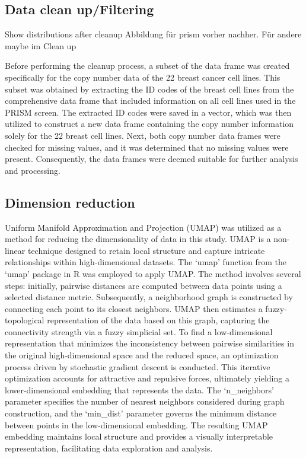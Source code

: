 \documentclass[
  11pt,
]{article}
\begin{document}
\hypertarget{data-clean-upfiltering}{%
\subsection{Data clean up/Filtering}\label{data-clean-upfiltering}}

Show distributions after cleanup Abbildung für prism vorher nachher. Für
andere maybe im Clean up

Before performing the cleanup process, a subset of the data frame was
created specifically for the copy number data of the 22 breast cancer
cell lines. This subset was obtained by extracting the ID codes of the
breast cell lines from the comprehensive data frame that included
information on all cell lines used in the PRISM screen. The extracted ID
codes were saved in a vector, which was then utilized to construct a new
data frame containing the copy number information solely for the 22
breast cell lines. Next, both copy number data frames were checked for
missing values, and it was determined that no missing values were
present. Consequently, the data frames were deemed suitable for further
analysis and processing.

\hypertarget{dimension-reduction}{%
\subsection{Dimension reduction}\label{dimension-reduction}}

Uniform Manifold Approximation and Projection (UMAP) was utilized as a
method for reducing the dimensionality of data in this study. UMAP is a
non-linear technique designed to retain local structure and capture
intricate relationships within high-dimensional datasets. The `umap'
function from the `umap' package in R was employed to apply UMAP. The
method involves several steps: initially, pairwise distances are
computed between data points using a selected distance metric.
Subsequently, a neighborhood graph is constructed by connecting each
point to its closest neighbors. UMAP then estimates a fuzzy-topological
representation of the data based on this graph, capturing the
connectivity strength via a fuzzy simplicial set. To find a
low-dimensional representation that minimizes the inconsistency between
pairwise similarities in the original high-dimensional space and the
reduced space, an optimization process driven by stochastic gradient
descent is conducted. This iterative optimization accounts for
attractive and repulsive forces, ultimately yielding a lower-dimensional
embedding that represents the data. The `n\_neighbors' parameter
specifies the number of nearest neighbors considered during graph
construction, and the `min\_dist' parameter governs the minimum distance
between points in the low-dimensional embedding. The resulting UMAP
embedding maintains local structure and provides a visually
interpretable representation, facilitating data exploration and
analysis.
\end{document}
